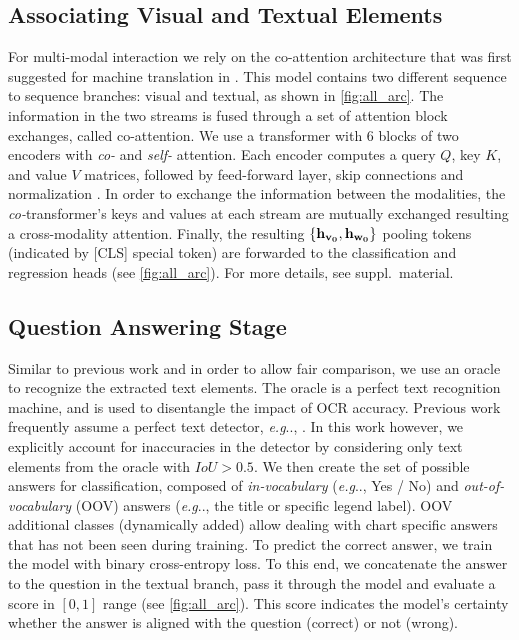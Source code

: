 \documentclass[runningheads]{llncs}
\makeatletter
\DeclareRobustCommand\onedot{\futurelet\@let@token\@onedot}
\def\@onedot{\ifx\@let@token.\else.\null\fi\xspace}
\def\eg{\emph{e.g}\onedot} \def\Eg{\emph{E.g}\onedot}
\makeatother
\begin{document}
\subsection{Associating Visual and Textual Elements}
\label{sec:associating_visual_and_textual}
For multi-modal interaction we rely on the co-attention architecture that was first suggested for machine translation in \cite{neuralMachineTranslation_ICLR15}. This model contains two different sequence to sequence branches: visual and textual, as shown in \cref{fig:all_arc}. The information in the two streams is fused through a set of attention block exchanges, called co-attention. We use a transformer with 6 blocks of two encoders with {\it co-} and {\it self-} attention. Each encoder computes a query $Q$, key $K$, and value $V$ matrices, followed by feed-forward layer, skip connections and normalization \cite{vaswani2017attention}. In order to exchange the information between the modalities, the {\it co-}transformer's keys and values at each stream are mutually exchanged resulting a cross-modality attention.
Finally, the resulting ${\bf \{h_{v_0}},{\bf h_{w_0}}\}$ pooling tokens (indicated by [CLS] special token) are forwarded to the classification and regression heads (see \cref{fig:all_arc}). For more details, see suppl.~material.


\subsection{Question Answering Stage}
\label{sec:question_answering_stage}
Similar to previous work \cite{chartqa, prefil, chaudhry2019leafqa, dvqa, plotqa} and in order to allow fair comparison, we use an oracle to recognize the extracted text elements. The oracle is a perfect text recognition machine, and is used to disentangle the impact of OCR accuracy. Previous work frequently assume a perfect text detector, \eg, \cite{figureqa, dvqa, chartqa, plotqa}. In this work however, we explicitly account for inaccuracies in the detector by considering only text elements from the oracle with $\textit{IoU}>0.5$. We then create the set of possible answers for classification, composed of {\it in-vocabulary} (\eg, Yes / No) and {\it out-of-vocabulary} (OOV) answers (\eg, the title or specific legend label).
OOV additional classes (dynamically added) allow dealing with chart specific answers that has not been seen during training. To predict the correct answer, we train the model with binary cross-entropy loss. To this end, we concatenate the answer to the question in the textual branch, pass it through the model and evaluate a score in $[0,1]$ range (see \cref{fig:all_arc}). This score indicates the model's certainty whether the answer is aligned with the question (correct) or not (wrong).
\end{document}

